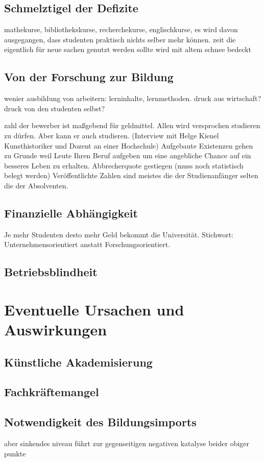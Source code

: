 \documentclass[a4paper,10pt,twoside,titlepage]{article}
\begin{document}
\subsection{Schmelztigel der Defizite}
mathekurse, bibliothekskurse, recherchekurse, englischkurse, es wird davon ausgegangen, dass studenten praktisch nichts selber mehr können. zeit die eigentlich für neue sachen genutzt werden sollte wird mit altem schnee bedeckt

\subsection{Von der Forschung zur Bildung}
wenier ausbildung von arbeitern: lerninhalte, lernmethoden. druck aus wirtschaft? druck von den studenten selbst?

zahl der bewerber ist maßgebend für geldmittel. Allen wird versprochen studieren zu dürfen. Aber kann er auch studieren. (Interview mit Helge Kienel Kunsthistoriker und Dozent an einer Hochschule) Aufgebaute Existenzen gehen zu Grunde weil Leute Ihren Beruf aufgeben um eine angebliche Chance auf ein besseres Leben zu erhalten. Abbrecherquote gestiegen (muss noch statistisch belegt werden) Veröffentlichte Zahlen sind meistes die der Studienanfänger selten die der Absolventen. 
\subsection{Finanzielle Abhängigkeit}
Je mehr Studenten desto mehr Geld bekommt die Universität. Stichwort: Unternehmensorientiert anstatt Forschungsorientiert. 

\subsection{Betriebsblindheit}

\section{Eventuelle Ursachen und Auswirkungen}

\subsection{Künstliche Akademisierung} 

\subsection{Fachkräftemangel}

\subsection{Notwendigkeit des Bildungsimports}
aber sinkendes niveau führt zur gegenseitigen negativen katalyse beider obiger punkte
\end{document}
